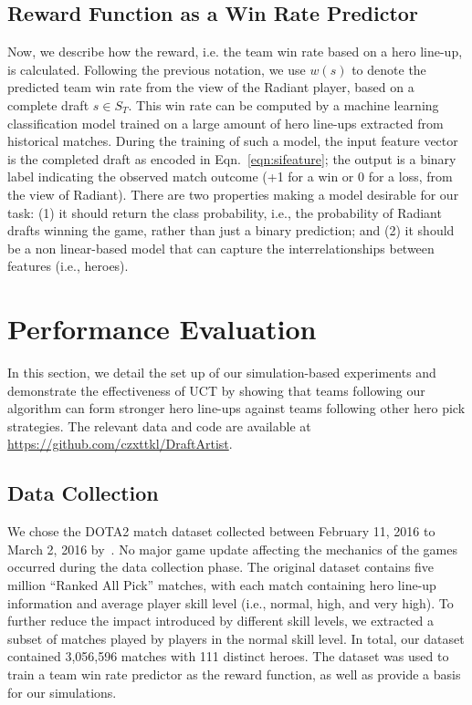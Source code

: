 \subsection{Reward Function as a Win Rate Predictor}\label{sec:rewardfunction}
Now, we describe how the reward, i.e. the team win rate based on a hero line-up, is calculated. Following the previous notation, we use $w(s)$ to denote the predicted team win rate from the view of the Radiant player, based on a complete draft $s \in S_T$. This win rate can be computed by a machine learning classification model trained on a large amount of hero line-ups extracted from historical matches. During the training of such a model, the input feature vector is the completed draft as encoded in Eqn.~\ref{eqn:sifeature}; the output is a binary label indicating the observed match outcome (+1 for a win or 0 for a loss, from the view of Radiant). There are two properties making a model desirable for our task: (1) it should return the class probability, i.e., the probability of Radiant drafts winning the game, rather than just a binary prediction; and (2) it should be a non linear-based model that can capture the interrelationships between features (i.e., heroes). 


\section{Performance Evaluation}\label{ressection}
In this section, we detail the set up of our simulation-based experiments and demonstrate the effectiveness of UCT by showing that teams following our algorithm can form stronger hero line-ups against teams following other hero pick strategies. The relevant data and code are available at \url{https://github.com/czxttkl/DraftArtist}.

\subsection{Data Collection}
We chose the DOTA2 match dataset collected between February 11, 2016 to March 2, 2016 by~\textcite{Semenov2016}. No major game update affecting the mechanics of the games occurred during the data collection phase. The original dataset contains five million ``Ranked All Pick'' matches, with each match containing hero line-up information and average player skill level (i.e., normal, high, and very high). To further reduce the impact introduced by different skill levels, 
we extracted a subset of matches played by players in the normal skill level. In total, our dataset contained 3,056,596 matches with 111 distinct heroes. The dataset was used to train a team win rate predictor as the reward function, as well as provide a basis for our simulations.

